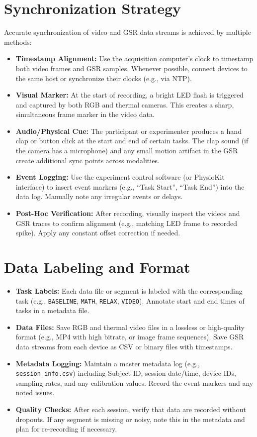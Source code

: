 \section{Synchronization Strategy}
Accurate synchronization of video and GSR data streams is achieved by multiple methods:
\begin{itemize}
    \item \textbf{Timestamp Alignment:} Use the acquisition computer’s clock to timestamp both video frames and GSR samples. Whenever possible, connect devices to the same host or synchronize their clocks (e.g., via NTP).
    \item \textbf{Visual Marker:} At the start of recording, a bright LED flash is triggered and captured by both RGB and thermal cameras. This creates a sharp, simultaneous frame marker in the video data.
    \item \textbf{Audio/Physical Cue:} The participant or experimenter produces a hand clap or button click at the start and end of certain tasks. The clap sound (if the camera has a microphone) and any small motion artifact in the GSR create additional sync points across modalities.
    \item \textbf{Event Logging:} Use the experiment control software (or PhysioKit interface) to insert event markers (e.g., “Task Start”, “Task End”) into the data log. Manually note any irregular events or delays.
    \item \textbf{Post-Hoc Verification:} After recording, visually inspect the videos and GSR traces to confirm alignment (e.g., matching LED frame to recorded spike). Apply any constant offset correction if needed.
\end{itemize}


\section{Data Labeling and Format}
\begin{itemize}
    \item \textbf{Task Labels:} Each data file or segment is labeled with the corresponding task (e.g., \texttt{BASELINE}, \texttt{MATH}, \texttt{RELAX}, \texttt{VIDEO}). Annotate start and end times of tasks in a metadata file.
    \item \textbf{Data Files:} Save RGB and thermal video files in a lossless or high-quality format (e.g., MP4 with high bitrate, or image frame sequences). Save GSR data streams from each device as CSV or binary files with timestamps.
    \item \textbf{Metadata Logging:} Maintain a master metadata log (e.g., \texttt{session\_info.csv}) including Subject ID, session date/time, device IDs, sampling rates, and any calibration values. Record the event markers and any noted issues.
    \item \textbf{Quality Checks:} After each session, verify that data are recorded without dropouts. If any segment is missing or noisy, note this in the metadata and plan for re-recording if necessary.
\end{itemize}


